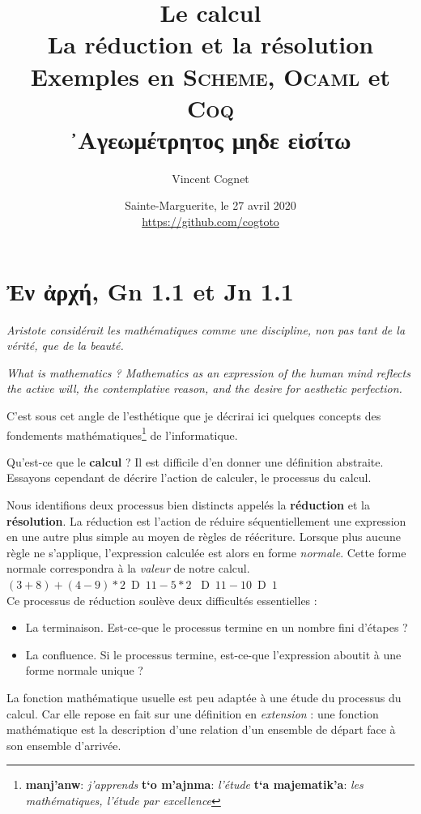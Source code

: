\documentclass[11pt]{book}
\title{Le calcul \\
     La réduction et la résolution \\
	 Exemples en \textsc{Scheme}, \textsc{Ocaml} et \textsc{Coq} \\ \vspace{1cm}
   \textgreek{᾿Αγεωμέτρητος μηδε εἰσίτω} \\
      }
\author{Vincent Cognet}
\date{Sainte-Marguerite, le 27 avril 2020 \\
      \url{https://github.com/cogtoto}}
\newcommand{\imp}{{\letterimp D}\hspace{0.1cm}}
\begin{document}
\maketitle
\tableofcontents


\chapter{\textgreek{Ἐν ἀρχή}, Gn 1.1 et Jn 1.1}

\textit{Aristote considérait les mathématiques comme une discipline, non pas tant de la vérité, que de la beauté.}
\cite{ab}


\textit{What is mathematics ? Mathematics as an expression of the human mind reflects
the active will, the contemplative reason, and the desire for aesthetic perfection.} \cite{wm}


C'est sous cet angle de l'esthétique que je décrirai  ici quelques concepts 
 des fondements mathématiques\footnote{\textgreek{\textbf{manj'anw}}: \textit{j'apprends} 
\textgreek{\textbf{t`o m'ajnma}}: \textit{l'étude} 
\textgreek{\textbf{t`a majematik'a}}: \textit{les mathématiques, l'étude par excellence}} de l'informatique. \\

 \vspace{0.5cm}

Qu'est-ce que le \textbf{calcul} ? Il est difficile d'en donner une définition abstraite. Essayons cependant de 
décrire l'action de calculer, le processus du calcul. 

Nous identifions deux processus bien distincts appelés la \textbf{réduction} et la \textbf{résolution}.
La réduction est l'action de réduire séquentiellement une expression en une autre plus simple
au moyen de règles de réécriture. Lorsque plus aucune règle ne s'applique, l'expression calculée est alors en forme
\textit{normale}. Cette forme normale correspondra à la \textit{valeur} de notre calcul. \\
$(3+8)+(4-9)*2$ \,\imp\,  $11 -5*2$ \, \imp\, $11 -10$ \,\imp\, $1$ \\

Ce processus de réduction soulève deux difficultés essentielles : 
\begin{itemize}
	\item La terminaison. Est-ce-que le processus termine en un nombre fini d'étapes ?
	\item La confluence. Si le processus termine, est-ce-que l'expression aboutit à une forme normale unique ?
\end{itemize}
\vspace{0.3cm}
La fonction mathématique usuelle est peu adaptée à une étude du processus du calcul. Car elle
repose en fait sur une définition en \textit{extension} : une fonction mathématique est la 
description d'une relation d'un ensemble de départ face à son ensemble d'arrivée.
\end{document}

